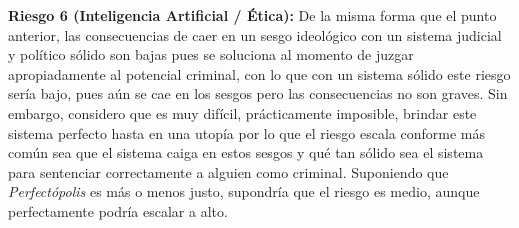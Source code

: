 \begin{enumerateColor}
    \item \textbf{Riesgo 6 (Inteligencia Artificial / Ética):} 
	De la misma forma que el punto anterior, las consecuencias de caer en un sesgo ideológico con un sistema judicial y político sólido son bajas pues se soluciona al momento de juzgar apropiadamente al potencial criminal, con lo que con un sistema sólido este riesgo sería bajo, pues aún se cae en los sesgos pero las consecuencias no son graves. Sin embargo, considero que es muy difícil, prácticamente imposible, brindar este sistema perfecto hasta en una utopía por lo que el riesgo escala conforme más común sea que el sistema caiga en estos sesgos y qué tan sólido sea el sistema para sentenciar correctamente a alguien como criminal. Suponiendo que \textit{Perfectópolis} es más o menos justo, supondría que el riesgo es medio, aunque perfectamente podría escalar a alto.

\end{enumerateColor}
